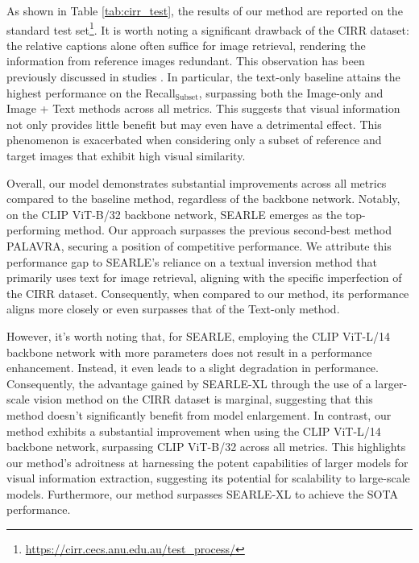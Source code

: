 \documentclass[10pt,twocolumn,letterpaper]{article}
\begin{document}
\begin{table*}[!ht]
{\begin{tabular}{clccccccc}
\bottomrule
  \end{tabular}
  }
  \caption{Quantitative results on CIRR test set. Best and second-best scores are highlighted in bold and underlined, respectively. $^{\dagger}$ and $^\S$ indicates results from~\cite{Baldrati_2023_ICCV} and \cite{saito2023pic2word}, respectively. -- denotes results not reported in the original paper.}
  \label{tab:cirr_test}
\end{table*}

As shown in Table \ref{tab:cirr_test}, the results of our method are reported on the standard test set\footnote{\url{https://cirr.cecs.anu.edu.au/test_process/}}. It is worth noting a significant drawback of the CIRR dataset: the relative captions alone often suffice for image retrieval, rendering the information from reference images redundant. This observation has been previously discussed in studies \cite{saito2023pic2word, Baldrati_2023_ICCV}. In particular, the text-only baseline attains the highest performance on the Recall$_\text{Subset}$, surpassing both the Image-only and Image + Text methods across all metrics. This suggests that visual information not only provides little benefit but may even have a detrimental effect. This phenomenon is exacerbated when considering only a subset of reference and target images that exhibit high visual similarity.

Overall, our model demonstrates substantial improvements across all metrics compared to the baseline method, regardless of the backbone network. Notably, on the CLIP ViT-B/32 backbone network, SEARLE emerges as the top-performing method. Our approach surpasses the previous second-best method PALAVRA, securing a position of competitive performance. We attribute this performance gap to SEARLE's reliance on a textual inversion method that primarily uses text for image retrieval, aligning with the specific imperfection of the CIRR dataset. Consequently, when compared to our method, its performance aligns more closely or even surpasses that of the Text-only method. 

However, it's worth noting that, for SEARLE, employing the CLIP ViT-L/14 backbone network with more parameters does not result in a performance enhancement. Instead, it even leads to a slight degradation in performance. Consequently, the advantage gained by SEARLE-XL through the use of a larger-scale vision method on the CIRR dataset is marginal, suggesting that this method doesn't significantly benefit from model enlargement. In contrast, our method exhibits a substantial improvement when using the CLIP ViT-L/14 backbone network, surpassing CLIP ViT-B/32 across all metrics. This highlights our method's adroitness at harnessing the potent capabilities of larger models for visual information extraction, suggesting its potential for scalability to large-scale models. Furthermore, our method surpasses SEARLE-XL to achieve the SOTA performance. 
\end{document}

